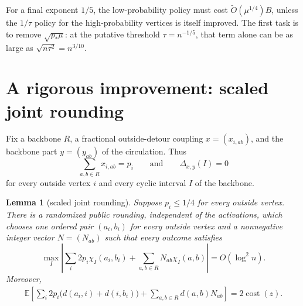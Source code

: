 \documentclass[11pt]{article}
\newtheorem{lemma}[theorem]{Lemma}
\theoremstyle{remark}
\newcommand{\E}{\mathbb E}
\newcommand{\cost}{\operatorname{cost}}
\begin{document}
For a final exponent $1/5$, the low-probability policy must cost
$\widetilde O(\mu^{1/4})B$, unless the $1/\tau$ policy for the
high-probability vertices is itself improved.  The first task is to remove
$\sqrt{p_*\mu}$: at the putative threshold $\tau=n^{-1/5}$, that term alone
can be as large as $\sqrt{n\tau^2}=n^{3/10}$.

\section{A rigorous improvement: scaled joint rounding}

Fix a backbone $R$, a fractional outside-detour coupling
$x=(x_{i,ab})$, and the backbone part $y=(y_{ab})$ of the circulation.  Thus
\[
  \sum_{a,b\in R}x_{i,ab}=p_i
  \qquad\text{and}\qquad
  \Delta_{x,y}(I)=0
\]
for every outside vertex $i$ and every cyclic interval $I$ of the backbone.

\begin{lemma}[scaled joint rounding]\label{lem:scaled-rounding}
Suppose $p_i\le1/4$ for every outside vertex.  There is a randomized public
rounding, independent of the activations, which chooses one ordered pair
$(a_i,b_i)$ for every outside vertex and a nonnegative integer vector
$N=(N_{ab})$ such that every outcome satisfies
\begin{equation}\label{eq:scaled-public-balance}
 \max_I\left|
   \sum_i2p_i\chi_I(a_i,b_i)
   +\sum_{a,b\in R}N_{ab}\chi_I(a,b)
 \right|=O(\log^2 n).
\end{equation}
Moreover,
\begin{align}
 \E\!\left[
   \sum_i2p_i\bigl(d(a_i,i)+d(i,b_i)\bigr)
   +\sum_{a,b\in R}d(a,b)N_{ab}
 \right]
 =2\cost(z).                                      \label{eq:scaled-cost}
\end{align}
\end{lemma}
\end{document}
